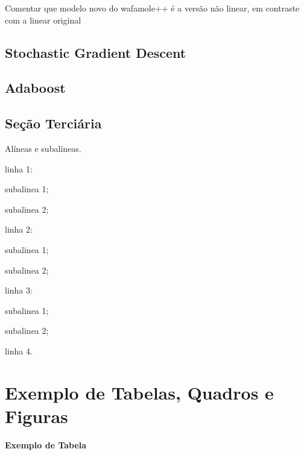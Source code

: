 Comentar que modelo novo do wafamole++ é a versão não linear, em contraste com a linear original

\subsection{Stochastic Gradient Descent}

\subsection{Adaboost}


\subsection{Seção Terciária}

Alíneas e subalíneas.
\bigskip

\begin{alineas}
\item linha 1:
\begin{alineas}
\item subalinea 1;
\item subalinea 2;
\end{alineas}
\item linha 2:
\begin{subalineas}
\item subalinea 1;
\item subalinea 2;
\end{subalineas}
\item linha 3:
\begin{incisos}
\item subalinea 1;
\item subalinea 2;
\end{incisos}
\item linha 4.
\end{alineas}


\section{Exemplo de Tabelas, Quadros e Figuras}

{\centering\bfseries\color{red}
Exemplo de Tabela
\par}

